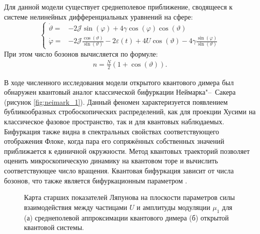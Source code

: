 Для данной модели существует среднеполевое приближение, сводящееся к системе нелинейных дифференциальных уравнений на сфере:
\begin{equation}
	\label{eq:dimer_meanfield_ode_sphere}
	\left\{
	\begin{array}{rl}
		\dot{\vartheta} = & -2\mathcal{J}\sin{\left(\varphi\right)} + 4\gamma \cos{\left(\varphi\right)}\cos{\left(\vartheta\right)} \\
		\dot{\varphi} = & -2 \mathcal{J} \frac{\cos{\left(\vartheta\right)}}{\sin{\left(\vartheta\right)}} - 2\varepsilon\left(t\right) + 4U \cos{\left(\vartheta\right)} - 4\gamma\frac{\sin{\left(\varphi\right)}}{\sin{\left(\vartheta\right)}}
	\end{array}
	\right.
\end{equation}
При этом число бозонов вычисляется по формуле:
\begin{equation}
	\label{eq:dimer_meanfield_num_bosons}
	\begin{gathered}
		n=\frac{N}{2}(1+\cos{\left(\vartheta\right)}).
	\end{gathered}
\end{equation}

В ходе численного исследования модели открытого квантового димера был обнаружен квантовый аналог классической бифуркации Неймарка"--~Сакера (рисунок \cref{fig:neimark_1}).
Данный феномен характеризуется появлением бубликообразных стробоскопических распределений, как для проекции Хусими на классическое фазовое пространство, так и для квантовых наблюдаемых.
Бифуркация также видна в спектральных свойствах соответствующего отображения Флоке, когда пара его сопряжённых собственных значений приближается к единичной окружности.
Метод квантовых траекторий позволяет оценить микроскопическую динамику на квантовом торе и вычислить соответствующее число вращения.
Квантовая бифуркация зависит от числа бозонов, что также является бифуркационным параметром \cite{Yusipov2019_1}.

\begin{figure}[h!]
	\legend{}
	\caption[]
	{
		Карта старших показателей Ляпунова на плоскости параметров силы взаимодействия между частицами $U$ и амплитуды модуляции $\mu_1$ для (а) среднеполевой аппроксимации квантового димера (б) открытой квантовой системы.
	}
	\label{fig:le_1}
\end{figure}


